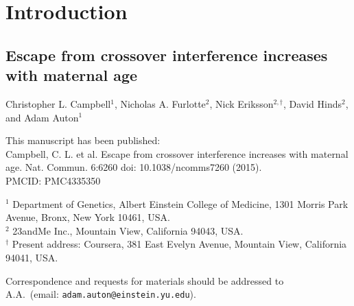 \documentclass[11pt,twoside,openright,letterpaper]{memoir}
\begin{document}
\SingleSpacing
\clearpage
\tableofcontents
\listoffigures
\listoftables

\glsaddall
\clearpage\begingroup\let\newpage\relax
    \printglossary[type=main,style=long,nonumberlist,title={List of Abbreviations}]
\endgroup


\mainmatter

 \DoubleSpacing
\chapter{Introduction} \label{ch:introduction}


\begin{SingleSpace}
\chapter[Escape from crossover interference increases with maternal age][Interference escape increases with maternal age]{Escape from crossover interference increases with maternal age} \label{ch:cointEsc}

\noindent Christopher L. Campbell$^1$, Nicholas A. Furlotte$^2$, Nick Eriksson$^{2,\dagger}$, David Hinds$^2$, and Adam Auton$^1$

\vspace{0.5cm}
\noindent This manuscript has been published: \\
Campbell, C. L. et al. Escape from crossover interference increases with maternal age. Nat. Commun. 6:6260 doi: 10.1038/ncomms7260 (2015). \\
PMCID: PMC4335350

\vspace{0.5cm}
\noindent $^1$ Department of Genetics, Albert Einstein College of Medicine, 1301 Morris Park Avenue, Bronx, New York 10461, USA. \\
\noindent $^2$ 23andMe Inc., Mountain View, California 94043, USA. \\
\noindent $^\dagger$ Present address: Coursera, 381 East Evelyn Avenue, Mountain View, California 94041, USA. \\

\vspace{0.5cm}
\begin{centering}
    Correspondence and requests for materials should be addressed to \\
    A.A.\ (email: \texttt{adam.auton@einstein.yu.edu}). \\
\end{centering}
\end{SingleSpace}
\end{document}
